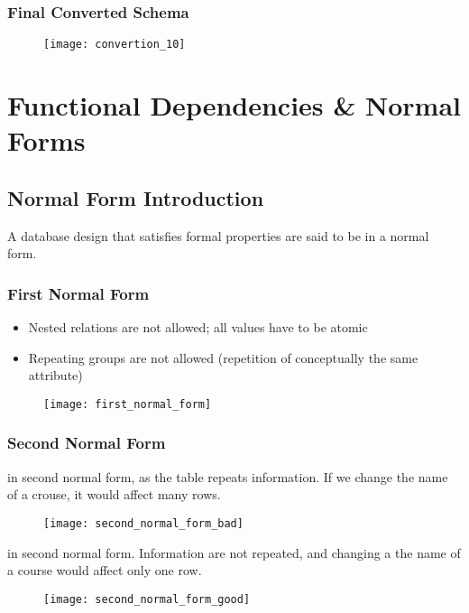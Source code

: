 \subsection{Final Converted Schema}

\begin{figure}[H]
    \centering
    \texttt{[image: convertion\_10]}
\end{figure}

\chapter{Functional Dependencies \& Normal Forms}

\section{Normal Form Introduction}

A database design that satisfies formal properties are said to be in a normal form.

\subsection{First Normal Form}

\begin{itemize}
    \item Nested relations are not allowed; all values have to be atomic
    \item Repeating groups are not allowed (repetition of conceptually the same attribute)
\end{itemize}

\begin{figure}[H]
    \centering
    \texttt{[image: first\_normal\_form]}
\end{figure}

\subsection{Second Normal Form}

\begin{minipage}[t]{0.48\textwidth}
 in second normal form, as the table repeats information. If we change the name of a crouse, it would affect many rows.
\begin{figure}[H]
    \centering
    \texttt{[image: second\_normal\_form\_bad]}
\end{figure}
\end{minipage}
\hfill
\begin{minipage}[t]{0.48\textwidth}
 in second normal form. Information are not repeated, and changing a the name of a course would affect only one row.
\begin{figure}[H]
    \centering
    \texttt{[image: second\_normal\_form\_good]}
\end{figure}
\end{minipage}

